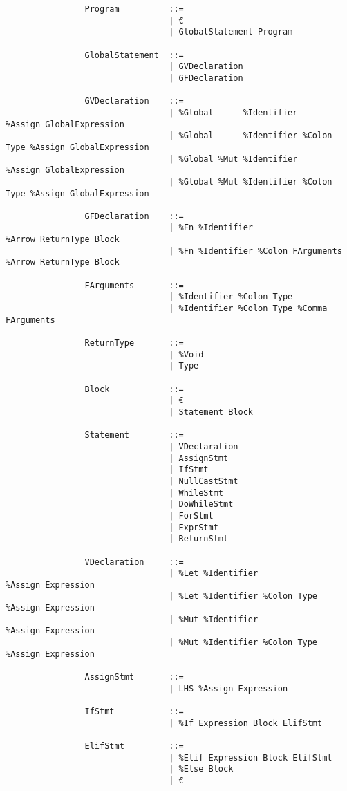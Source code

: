\documentclass{article}
\begin{document}
			\begin{verbatim}
				Program          ::=
				                 | €
				                 | GlobalStatement Program
				                 
				GlobalStatement  ::=
				                 | GVDeclaration
				                 | GFDeclaration
				                 
				GVDeclaration    ::=
				                 | %Global      %Identifier             %Assign GlobalExpression
				                 | %Global      %Identifier %Colon Type %Assign GlobalExpression
				                 | %Global %Mut %Identifier             %Assign GlobalExpression
				                 | %Global %Mut %Identifier %Colon Type %Assign GlobalExpression
				                 
				GFDeclaration    ::=
				                 | %Fn %Identifier                   %Arrow ReturnType Block
				                 | %Fn %Identifier %Colon FArguments %Arrow ReturnType Block
				                 
				FArguments       ::=
				                 | %Identifier %Colon Type
				                 | %Identifier %Colon Type %Comma FArguments
				
				ReturnType       ::=
				                 | %Void
				                 | Type
				                 
				Block            ::=
				                 | €
				                 | Statement Block
				
				Statement        ::=
				                 | VDeclaration
				                 | AssignStmt
				                 | IfStmt
				                 | NullCastStmt
				                 | WhileStmt
				                 | DoWhileStmt
				                 | ForStmt
				                 | ExprStmt
				                 | ReturnStmt
				                 
				VDeclaration     ::=
				                 | %Let %Identifier             %Assign Expression
				                 | %Let %Identifier %Colon Type %Assign Expression
				                 | %Mut %Identifier             %Assign Expression
				                 | %Mut %Identifier %Colon Type %Assign Expression
				                 
				AssignStmt       ::=
				                 | LHS %Assign Expression
				                 
				IfStmt           ::=
				                 | %If Expression Block ElifStmt
				                 
				ElifStmt         ::=
				                 | %Elif Expression Block ElifStmt
				                 | %Else Block
				                 | €
				                 

\end{verbatim}
\end{document}
